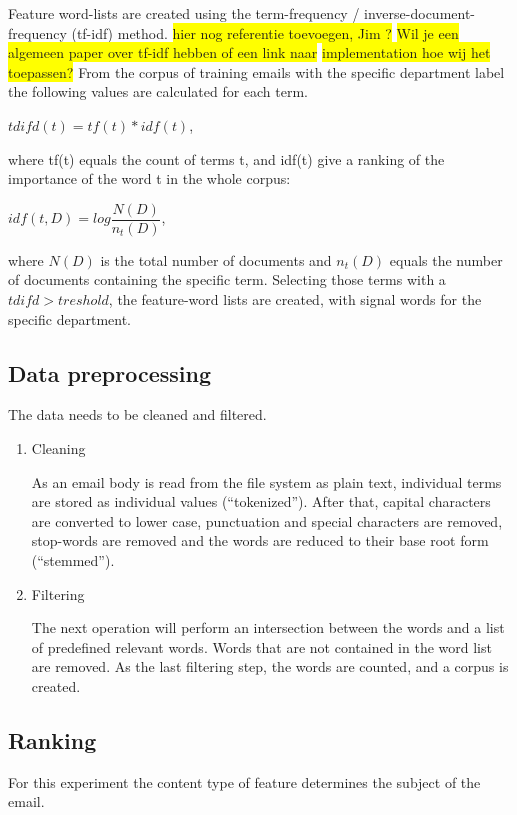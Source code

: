 \documentclass[journal]{IEEEtran}
\begin{document}
Feature word-lists are created using the term-frequency / inverse-document-frequency (tf-idf) method. \colorbox{yellow}{ hier nog referentie toevoegen, Jim ?} \colorbox{yellow}{Wil je een algemeen paper over tf-idf hebben of een link naar} \colorbox{yellow}{implementation hoe wij het toepassen?} From the corpus of training emails with the specific department label the following values are calculated for each term. 
\begin{center}
    $tdifd(t) = tf(t) * idf(t)$,
\end{center}
where tf(t) equals the count of terms t, and idf(t) give a ranking of the importance of the word t in the whole corpus: 
\begin{center}
    $idf(t, D) = log\dfrac{N(D)}{n_t(D)}$, 
\end{center}
where $N(D)$ is the total number of documents and $n_t(D)$ equals the number of documents containing the specific term. 
Selecting those terms with a $tdifd > treshold$, the feature-word lists are created, with signal words for the specific department.

\subsection{Data preprocessing}
The data needs to be cleaned and filtered.

\begin{enumerate}
    \item Cleaning

    As an email body is read from the file system as plain text, individual terms are stored as individual values (``tokenized''). After that, capital characters are converted to lower case, punctuation and special characters are removed, stop-words are removed and the words are reduced to their base root form (``stemmed'').

    \item Filtering

    The next operation will perform an intersection between the words and a list of predefined relevant words. Words that are not contained in the word list are removed. As the last filtering step, the words are counted, and a corpus is created.

\end{enumerate}

\subsection{Ranking}
\label{subsec:ranking}
For this experiment the content type of feature determines the subject of the email.
\end{document}

